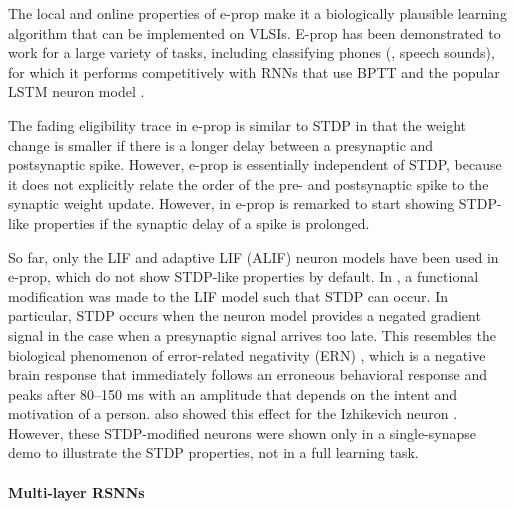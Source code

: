 	The local and online properties of e-prop make it a biologically plausible learning algorithm that can be implemented on VLSIs.
	E-prop has been demonstrated to work for a large variety of tasks, including classifying phones (\ie, speech sounds), for which it performs competitively with RNNs that use BPTT and the popular LSTM neuron model \citep{graves2013speech}.

	The fading eligibility trace in e-prop is similar to STDP in that the weight change is smaller if there is a longer delay between a presynaptic and postsynaptic spike.
	However, e-prop is essentially independent of STDP, because it does not explicitly relate the order of the pre- and postsynaptic spike to the synaptic weight update.
	However, in \citet{bellec2020solution} e-prop is remarked to start showing STDP-like properties if the synaptic delay of a spike is prolonged.

	So far, only the LIF and adaptive LIF (ALIF) neuron models have been used in e-prop, which do not show STDP-like properties by default.
	In \citet{traub2020learning}, a functional modification was made to the LIF model such that STDP can occur.
	In particular, STDP occurs when the neuron model provides a negated gradient signal in the case when a presynaptic signal arrives too late.
	This resembles the biological phenomenon of error-related negativity (ERN) \citep{nieuwenhuis2001error}, which is a negative brain response that immediately follows an erroneous behavioral response and peaks after 80--150 ms with an amplitude that depends on the intent and motivation of a person.
	\citet{traub2020learning} also showed this effect for the Izhikevich neuron \citep{izhikevich2003simple}.
	However, these STDP-modified neurons were shown only in a single-synapse demo to illustrate the STDP properties, not in a full learning task.

\paragraph{Multi-layer RSNNs}

